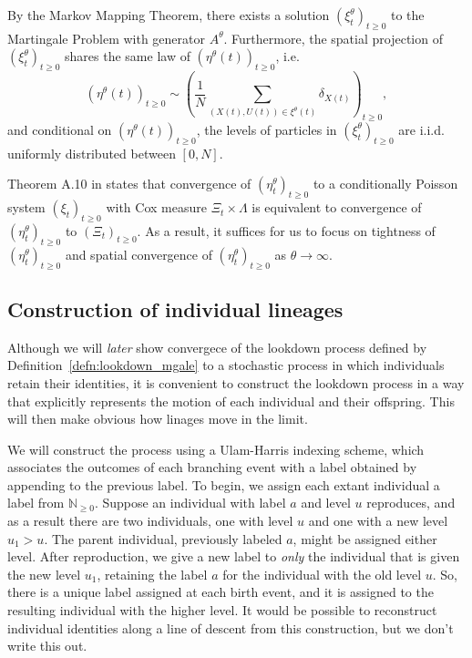 \documentclass[12pt]{article}
\newcommand{\IN}{\mathbb N}
\newcommand{\comment}[1]{{\color{blue} \it #1}}
\begin{document}
By the Markov Mapping Theorem,
there exists a solution $(\xi^{\theta}_t)_{t \geq 0}$
to the Martingale Problem with generator $A^{\theta}$.
Furthermore,
the spatial projection of $(\xi^{\theta}_t)_{t \geq 0}$
shares the same law of $(\eta^{\theta}(t))_{t \geq 0}$,
i.e.
$$(\eta^{\theta}(t))_{t \geq 0}
\sim \left(\frac{1}{N}\sum\limits_{(X(t),U(t))\in \xi^{\theta}(t)} \delta_{X(t)}\right)_{t \geq 0},$$
and conditional on 
$(\eta^{\theta}(t))_{t \geq 0}$,
the levels of particles in $(\xi^{\theta}_t)_{t \geq 0}$
are i.i.d. uniformly distributed between $[0,N]$.

Theorem A.10 in \cite{kurtz/rodrigues:2011}
states that convergence of $(\eta^{\theta}_t)_{t \geq 0}$
to a conditionally Poisson system $(\xi_t)_{t \geq 0}$
with Cox measure $\Xi_t \times \Lambda$
is equivalent to convergence of
$(\eta^{\theta}_t)_{t \geq 0}$ to $(\Xi_t)_{t \geq 0}$.
As a result, it suffices for us to focus on
tightness of $(\eta^{\theta}_t)_{t \geq 0}$
and spatial convergence of $(\eta^{\theta}_t)_{t \geq 0}$
as $\theta \to \infty$.


\subsection{Construction of individual lineages}

Although we will \comment{later} show convergece of the lookdown process
defined by Definition~\ref{defn:lookdown_mgale}
to a stochastic process in which individuals retain their identities,
it is convenient to construct the lookdown process
in a way that explicitly represents the motion of each individual and their offspring.
This will then make obvious how linages move in the limit.

We will construct the process using a Ulam-Harris indexing scheme,
which associates the outcomes of each branching event with a label obtained
by appending to the previous label.
To begin, we assign each extant individual a label from $\IN_{\ge 0}$.
Suppose an individual with label $a$ and level $u$ reproduces,
and as a result there are two individuals, one with level $u$ and one with a new level $u_1 > u$.
The parent individual, previously labeled $a$, might be assigned either level.
After reproduction, we give a new label to \emph{only} the individual
that is given the new level $u_1$,
retaining the label $a$ for the individual with the old level $u$.
So, there is a unique label assigned at each birth event,
and it is assigned to the resulting individual with the higher level.
It would be possible to reconstruct individual identities along a line of descent
from this construction,
but we don't write this out.
\end{document}
